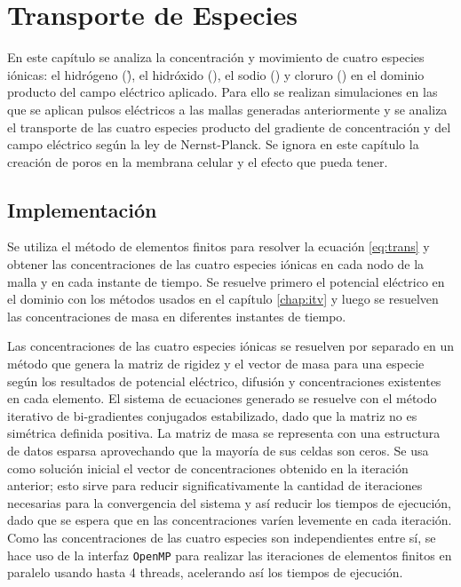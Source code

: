 \chapter{Transporte de Especies}

En este capítulo se analiza la concentración y movimiento de cuatro especies iónicas: el hidrógeno (\h), el hidróxido (\oh), el sodio (\na) y cloruro (\cl) en el dominio producto del campo eléctrico aplicado. Para ello se realizan simulaciones en las que se aplican pulsos eléctricos a las mallas generadas anteriormente y se analiza el transporte de las cuatro especies producto del gradiente de concentración y del campo eléctrico según la ley de Nernst-Planck. Se ignora en este capítulo la creación de poros en la membrana celular y el efecto que pueda tener.

\section{Implementación}

Se utiliza el método de elementos finitos para resolver la ecuación \ref{eq:trans} y obtener las concentraciones de las cuatro especies iónicas en cada nodo de la malla y en cada instante de tiempo. Se resuelve primero el potencial eléctrico en el dominio con los métodos usados en el capítulo \ref{chap:itv} y luego se resuelven las concentraciones de masa en diferentes instantes de tiempo.

Las concentraciones de las cuatro especies iónicas se resuelven por separado en un método que genera la matriz de rigidez y el vector de masa para una especie según los resultados de potencial eléctrico, difusión y concentraciones existentes en cada elemento. El sistema de ecuaciones generado se resuelve con el método iterativo de bi-gradientes conjugados estabilizado, dado que la matriz no es simétrica definida positiva. La matriz de masa se representa con una estructura de datos esparsa aprovechando que la mayoría de sus celdas son ceros. Se usa como solución inicial el vector de concentraciones obtenido en la iteración anterior; esto sirve para reducir significativamente la cantidad de iteraciones necesarias para la convergencia del sistema y así reducir los tiempos de ejecución, dado que se espera que en las concentraciones varíen levemente en cada iteración. Como las concentraciones de las cuatro especies son independientes entre sí, se hace uso de la interfaz \texttt{OpenMP} para realizar las iteraciones de elementos finitos en paralelo usando hasta 4 threads, acelerando así los tiempos de ejecución.

